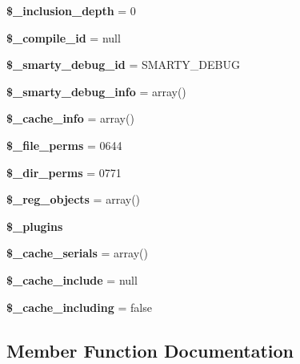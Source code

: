 \begin{DoxyCompactItemize}
\mbox{\label{class_smarty_ad6dc3a51fec08968aaf0a32459854d90}} 
{\bfseries \$\+\_\+inclusion\+\_\+depth} = 0
\item 
\mbox{\label{class_smarty_a551efac8c48403b89abaf2045ea7ce87}} 
{\bfseries \$\+\_\+compile\+\_\+id} = null
\item 
\mbox{\label{class_smarty_a1e05b9b9d9e20bbf1a3dc6e5b025d328}} 
{\bfseries \$\+\_\+smarty\+\_\+debug\+\_\+id} = \textquotesingle{}S\+M\+A\+R\+T\+Y\+\_\+\+D\+E\+B\+UG\textquotesingle{}
\item 
\mbox{\label{class_smarty_a6abb416343c0871273065557290c09e8}} 
{\bfseries \$\+\_\+smarty\+\_\+debug\+\_\+info} = array()
\item 
\mbox{\label{class_smarty_a8a51eed2eb208c11088be74cd0c789a3}} 
{\bfseries \$\+\_\+cache\+\_\+info} = array()
\item 
\mbox{\label{class_smarty_ab3667af976c165a8ec682bed8e604f18}} 
{\bfseries \$\+\_\+file\+\_\+perms} = 0644
\item 
\mbox{\label{class_smarty_a8796d0b932b4f89aacfd24b98c7110ba}} 
{\bfseries \$\+\_\+dir\+\_\+perms} = 0771
\item 
\mbox{\label{class_smarty_a5d2a71f86fe31f8e127019b8a10c0006}} 
{\bfseries \$\+\_\+reg\+\_\+objects} = array()
\item 
{\bfseries \$\+\_\+plugins}
\item 
\mbox{\label{class_smarty_ae322a17e7cf788392f43c169e6a3c9a8}} 
{\bfseries \$\+\_\+cache\+\_\+serials} = array()
\item 
\mbox{\label{class_smarty_aae2d5c88ed461aee5e4c1be7784da7bc}} 
{\bfseries \$\+\_\+cache\+\_\+include} = null
\item 
\mbox{\label{class_smarty_af82eb8ca663d8950888cf58c36cfbd41}} 
{\bfseries \$\+\_\+cache\+\_\+including} = false
\end{DoxyCompactItemize}


\subsection{Member Function Documentation}
\mbox{\label{class_smarty_a920b3e80a2cc5713250fbb7dec5f23fc}} 
